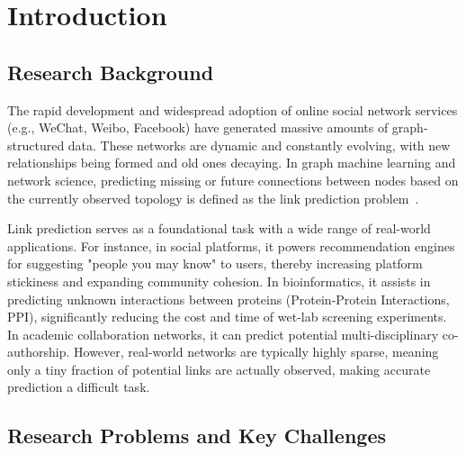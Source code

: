 
\chapter{Introduction}  %

\ifpdf
    \graphicspath{{Chapter1/Figs/Raster/}{Chapter1/Figs/PDF/}{Chapter1/Figs/}}
\else
    \graphicspath{{Chapter1/Figs/Vector/}{Chapter1/Figs/}}
\fi

\section{Research Background}

The rapid development and widespread adoption of online social network services (e.g., WeChat, Weibo, Facebook) have generated massive amounts of graph-structured data. These networks are dynamic and constantly evolving, with new relationships being formed and old ones decaying. In graph machine learning and network science, predicting missing or future connections between nodes based on the currently observed topology is defined as the link prediction problem~\citep{liben2007link}. 

Link prediction serves as a foundational task with a wide range of real-world applications. For instance, in social platforms, it powers recommendation engines for suggesting "people you may know" to users, thereby increasing platform stickiness and expanding community cohesion. In bioinformatics, it assists in predicting unknown interactions between proteins (Protein-Protein Interactions, PPI), significantly reducing the cost and time of wet-lab screening experiments. In academic collaboration networks, it can predict potential multi-disciplinary co-authorship. However, real-world networks are typically highly sparse, meaning only a tiny fraction of potential links are actually observed, making accurate prediction a difficult task.

\section{Research Problems and Key Challenges}

